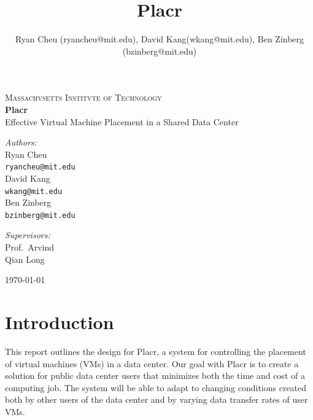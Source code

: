 \documentclass[11pt]{article}
\title{Placr}
\author{Ryan Cheu (ryancheu@mit.edu), David Kang(wkang@mit.edu), Ben Zinberg (bzinberg@mit.edu)}
\begin{document}
\begin{titlepage}

\begin{center}

\textsc{\LARGE Massachvsetts Institvte of Technology}\\[0.5cm]


{ \huge \bfseries Placr \\[0.4cm] }
{\Large Effective Virtual Machine Placement in a Shared Data Center}\\[0.5cm]


\begin{minipage}{0.4\textwidth}
\begin{flushleft} \large
\emph{Authors:}\\[0.5cm]
Ryan Cheu \\
{\tt ryancheu@mit.edu} \\[1cm]
David Kang \\
{\tt wkang@mit.edu} \\[1cm]
Ben Zinberg \\
{\tt bzinberg@mit.edu}
\end{flushleft}
\end{minipage}
\begin{minipage}{0.4\textwidth}
\begin{flushright} \large
  \emph{Supervisors:} \\[0.2cm]
Prof.\ Arvind \\
Qian Long
\end{flushright}
\end{minipage}

\vfill

{\large \today}

\end{center}

\end{titlepage}

\section{Introduction}

This report outlines the design for Placr, a system for controlling the placement of virtual machines (VMs) in a data center.  Our goal with Placr is to create a solution for public data center users that minimizes both the time and cost of a computing job.  The system will be able to adapt to changing conditions created both by other users of the data center and by varying data transfer rates of user VMs.
\end{document}
